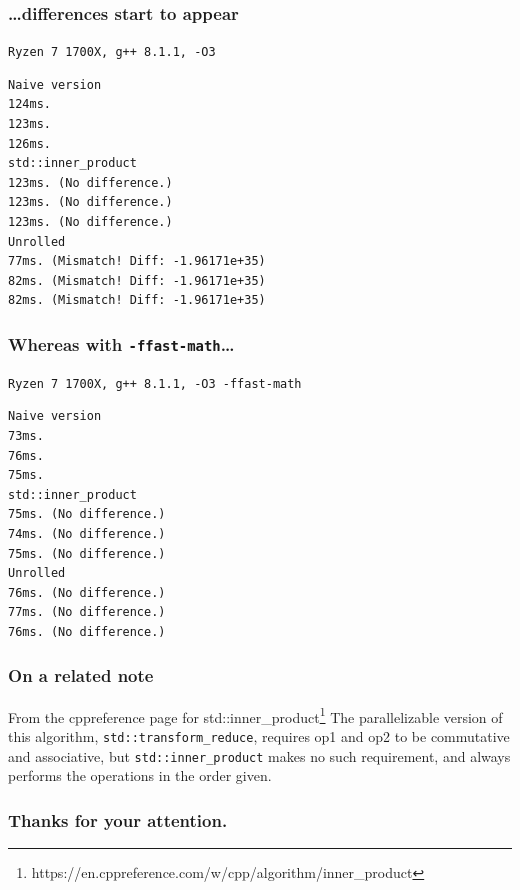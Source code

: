 \documentclass[aspectratio=43]{beamer}
\begin{document}
\begin{frame}[fragile]
  \frametitle{\ldots differences start to appear}
  \texttt{Ryzen 7 1700X, g++ 8.1.1, -O3}
    \begin{lstlisting}
Naive version
124ms.
123ms.
126ms.
std::inner_product
123ms. (No difference.)
123ms. (No difference.)
123ms. (No difference.)
Unrolled
77ms. (Mismatch! Diff: -1.96171e+35)
82ms. (Mismatch! Diff: -1.96171e+35)
82ms. (Mismatch! Diff: -1.96171e+35)
    \end{lstlisting}
\end{frame}


\begin{frame}[fragile]
  \frametitle{Whereas with \texttt{-ffast-math}\ldots}
  \texttt{Ryzen 7 1700X, g++ 8.1.1, -O3 {\color{red}-ffast-math}}
    \begin{lstlisting}
Naive version
73ms.
76ms.
75ms.
std::inner_product
75ms. (No difference.)
74ms. (No difference.)
75ms. (No difference.)
Unrolled
76ms. (No difference.)
77ms. (No difference.)
76ms. (No difference.)
    \end{lstlisting}
\end{frame}

\begin{frame}
  \frametitle{On a related note}

  \begin{block}{From the cppreference page for std::inner\_product\footnote{https://en.cppreference.com/w/cpp/algorithm/inner\_product}}
  The parallelizable version of this algorithm, \texttt{std::transform\_reduce}, requires op1 and op2 to be {\color{red}commutative and associative}, but \texttt{std::inner\_product} makes no such requirement, and always performs the operations in the order given. 
  \end{block}
\end{frame}


\begin{frame}
  \frametitle{Thanks for your attention.}
\end{frame}
\end{document}
